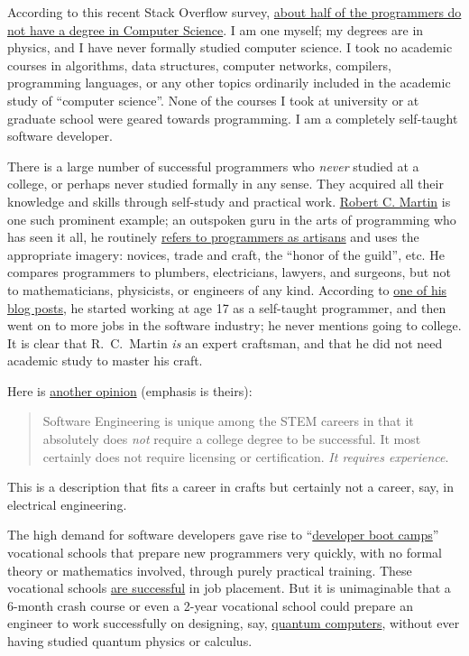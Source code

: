 According to this recent Stack Overflow survey, \href{https://thenextweb.com/insider/2016/04/23/dont-need-go-college-anymore-programmer/}{about half of the programmers do not have a degree in Computer Science}.
I am one myself; my degrees are in physics, and I have never formally
studied computer science. I took no academic courses in algorithms,
data structures, computer networks, compilers, programming languages,
or any other topics ordinarily included in the academic study of ``computer
science''. None of the courses I took at university or at graduate
school were geared towards programming. I am a completely self-taught
software developer.

There is a large number of successful programmers who \emph{never}
studied at a college, or perhaps never studied formally in any sense.
They acquired all their knowledge and skills through self-study and
practical work. \href{https://en.wikipedia.org/wiki/Robert_C._Martin}{Robert C. Martin}
is one such prominent example; an outspoken guru in the arts of programming
who has seen it all, he routinely \href{https://blog.cleancoder.com/uncle-bob/2013/02/01/The-Humble-Craftsman.html}{refers to programmers as artisans}
and uses the appropriate imagery: novices, trade and craft, the ``honor
of the guild'', etc. He compares programmers to plumbers, electricians,
lawyers, and surgeons, but not to mathematicians, physicists, or engineers
of any kind. According to \href{https://blog.cleancoder.com/uncle-bob/2013/11/25/Novices-Coda.html}{one of his blog posts},
he started working at age 17 as a self-taught programmer, and then
went on to more jobs in the software industry; he never mentions going
to college. It is clear that R.~C.~Martin \emph{is} an expert craftsman,
and that he did not need academic study to master his craft.

Here is \href{https://www.quora.com/Can-you-become-a-software-engineer-without-actually-going-to-university-college-How}{another opinion}
(emphasis is theirs):
\begin{quotation}
Software Engineering is unique among the STEM careers in that it absolutely
does \emph{not} require a college degree to be successful. It most
certainly does not require licensing or certification. \emph{It requires
experience}.
\end{quotation}
This is a description that fits a career in crafts \textendash{} but
certainly not a career, say, in electrical engineering.

The high demand for software developers gave rise to ``\href{https://cvbj.biz/2018/03/15/demand-software-developers-continues-soar-heres-cheapest-free-way-start-tech-career/}{developer boot camps}''
\textendash{} vocational schools that prepare new programmers very
quickly, with no formal theory or mathematics involved, through purely
practical training. These vocational schools \href{https://www.fullstackacademy.com/blog/why-are-some-coding-bootcamps-job-placement-rates-so-high}{are successful}
in job placement. But it is unimaginable that a 6-month crash course
or even a 2-year vocational school could prepare an engineer to work
successfully on designing, say, \href{https://www.dwavesys.com/quantum-computing}{quantum computers},
without ever having studied quantum physics or calculus.


